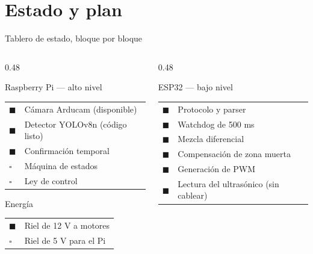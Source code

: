 \documentclass[aspectratio=169,10pt]{beamer}
\newcommand{\listo}{\textcolor{verde}{$\blacksquare$}}
\newcommand{\curso}{\textcolor{ambar}{$\blacksquare$}}
\newcommand{\pend}{\textcolor{grisclaro}{$\square$}}
\begin{document}
\section{Estado y plan}

\begin{frame}{Tablero de estado, bloque por bloque}
  \small
  \begin{columns}[T,onlytextwidth]
    \begin{column}{0.48\textwidth}
      \begin{block}{\textcolor{azul}{Raspberry Pi --- alto nivel}}
        \begin{tabular}{@{}p{0.4cm}p{4.6cm}@{}}
          \curso & Cámara Arducam (disponible) \\
          \curso & Detector YOLOv8n (código listo) \\
          \listo & Confirmación temporal \\
          \pend & Máquina de estados \\
          \pend & Ley de control \\
        \end{tabular}
      \end{block}
      \begin{block}{\textcolor{verde!60!black}{Energía}}
        \begin{tabular}{@{}p{0.4cm}p{4.6cm}@{}}
          \listo & Riel de 12 V a motores \\
          \pend & Riel de 5 V para el Pi \\
        \end{tabular}
      \end{block}
    \end{column}
    \begin{column}{0.48\textwidth}
      \begin{block}{\textcolor{naranja}{ESP32 --- bajo nivel}}
        \begin{tabular}{@{}p{0.4cm}p{4.6cm}@{}}
          \listo & Protocolo y parser \\
          \listo & Watchdog de 500 ms \\
          \listo & Mezcla diferencial \\
          \listo & Compensación de zona muerta \\
          \listo & Generación de PWM \\
          \curso & Lectura del ultrasónico (sin cablear) \\

\end{tabular}
\end{block}
\end{column}
\end{columns}
\end{frame}
\end{document}

